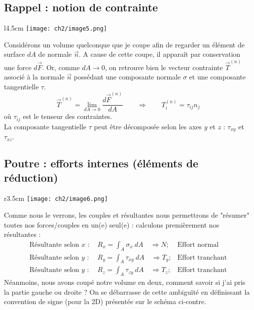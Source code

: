 	
	\subsection{Rappel : notion de contrainte}
	\begin{wrapfigure}[12]{l}{4.5cm}
	\vspace{-5mm}
	\texttt{[image: ch2/image5.png]}
	\end{wrapfigure}
	Considérons un volume quelconque que je coupe afin de regarder un 
	élément de surface $dA$ de normale $\vec{n}$. A cause de cette 
	coupe, il apparaît par conservation une force $d\vec{F}$. Or, comme 
	$dA\rightarrow0$, on retrouve bien le vecteur contrainte $\vec{T}^{
	(n)}$ associé à la normale $\vec{n}$ possédant une composante 
	normale $\sigma$ et une composante tangentielle $\tau$.
	\begin{equation}
	\vec{T}^{(n)} = \lim\limits_{dA\rightarrow0} \dfrac{d\vec{F}^{(n)}}{
	dA}\qquad\Longrightarrow\qquad T_i^{(n)} = \tau_{ij}n_j
	\end{equation}
	où $\tau_{ij}$ est le tenseur des contraintes.\\
	La composante tangentielle $\tau$ peut être décomposée selon les 
	axes $y$ et $z$ : $\tau_{xy}$ et $\tau_{xz}$.
	
	\subsection{Poutre : efforts internes (éléments de réduction)}
	\begin{wrapfigure}[8]{r}{3.5cm}
	\vspace{-5mm}
	\texttt{[image: ch2/image6.png]}
	\end{wrapfigure}	
	Comme nous le verrons, les couples et résultantes nous permettrons 
	de "résumer" toutes nos forces/couples en un(e) seul(e) : calculons 
	premièrement nos résultantes :
	\begin{equation}
	\begin{array}{lll}
	\text{Résultante selon $x$ : } & \displaystyle R_x = \int_A\sigma_x\ dA 
	\quad\Rightarrow N; & \text{Effort normal}\\
	\text{Résultante selon $y$ : } & \displaystyle R_y = \int_A\tau_{xy}\ dA 
	\quad\Rightarrow T_y; & \text{Effort tranchant}	\\
	\text{Résultante selon $y$ : } & \displaystyle R_z = \int_A\tau_{zy}\ dA 
	\quad\Rightarrow T_z ;& \text{Effort tranchant}		
	\end{array}
	\end{equation}
	Néanmoins, nous avons coupé notre volume en deux, comment savoir si j'ai 
	pris la partie gauche ou droite ? On se débarrasse de cette ambiguïté en 
	définissant la convention de signe (pour la 2D) présentée sur le schéma 
	ci-contre.\\
	
